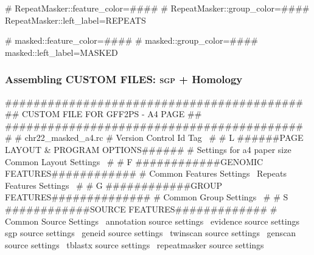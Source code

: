 \documentclass[11pt]{article}
\def\nwendcode{\endtrivlist \endgroup} %
\let\nwdocspar=\par                    %
\newcommand{\subsubsctn}[1]{\subsubsection{#1}}
\def\sgp{\textsc{sgp}}
\begin{document}
\nwenddocs{}\endmoddef
# RepeatMasker::feature_color=####
# RepeatMasker::group_color=####
RepeatMasker::left_label=REPEATS
\nwendcode{}\nwdocspar

\nwenddocs{}\endmoddef
# masked::feature_color=####
# masked::group_color=####
masked::left_label=MASKED
\nwendcode{}\nwdocspar

\subsubsctn{Assembling CUSTOM FILES: {\sgp} + Homology}

\nwenddocs{}\endmoddef
##########################################
##   CUSTOM FILE FOR GFF2PS - A4 PAGE   ##
##########################################
#
# chr22_masked_a4.rc
#
\LA{}Version Control Id Tag~{\nwtagstyle{}}\RA{}
#
# L ######PAGE LAYOUT & PROGRAM OPTIONS######
#
\LA{}Settings for a4 paper size~{\nwtagstyle{}}\RA{}
\LA{}Common Layout Settings~{\nwtagstyle{}}\RA{}
#
# F ############GENOMIC FEATURES############
#
\LA{}Common Features Settings~{\nwtagstyle{}}\RA{}
\LA{}Repeats Features Settings~{\nwtagstyle{}}\RA{}
#
# G ############GROUP FEATURES##############
#
\LA{}Common Group Settings~{\nwtagstyle{}}\RA{}
#
# S ############SOURCE FEATURES#############
#
\LA{}Common Source Settings~{\nwtagstyle{}}\RA{}
\LA{}annotation source settings~{\nwtagstyle{}}\RA{}
\LA{}evidence source settings~{\nwtagstyle{}}\RA{}
\LA{}sgp source settings~{\nwtagstyle{}}\RA{}
\LA{}geneid source settings~{\nwtagstyle{}}\RA{}
\LA{}twinscan source settings~{\nwtagstyle{}}\RA{}
\LA{}genscan source settings~{\nwtagstyle{}}\RA{}
\LA{}tblastx source settings~{\nwtagstyle{}}\RA{}
\LA{}repeatmasker source settings~{\nwtagstyle{}}\RA{}
\nwendcode{}\nwdocspar
\end{document}
